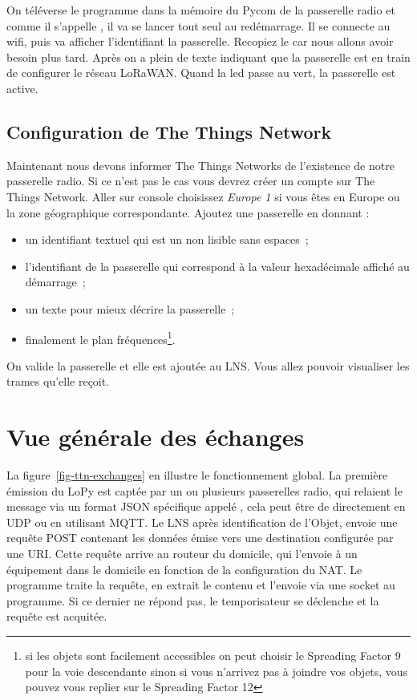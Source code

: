          \vspace{1em}


On téléverse le programme dans la mémoire du Pycom de la passerelle radio et comme il s'appelle , il va se lancer tout seul au redémarrage. Il se connecte au wifi, puis va afficher l'identifiant la passerelle. Recopiez le car nous allons avoir besoin plus tard. Après on a plein de texte indiquant que la passerelle est en train de configurer le réseau LoRaWAN. Quand la led passe au vert, la passerelle est active. 

\subsection{Configuration de The Things Network}


Maintenant nous devons informer The Things Networks de l'existence de notre passerelle radio. Si ce n'est pas le cas vous devrez créer un compte sur The Things Network. Aller sur console choisissez \textit{Europe 1} si vous êtes en Europe ou la zone géographique correspondante. Ajoutez une passerelle en donnant : 
\begin{itemize}
    \item un identifiant textuel qui est un non lisible sans espaces~;
    \item l'identifiant de la passerelle qui correspond à la valeur hexadécimale affiché au démarrage~;
    \item un texte pour mieux décrire la passerelle~;
    \item finalement le plan fréquences\footnote{si les objets sont facilement accessibles on peut choisir le Spreading Factor 9 pour la voie descendante sinon si vous n'arrivez pas à joindre vos objets, vous pouvez vous replier sur le Spreading Factor 12}. 
\end{itemize}

On valide la passerelle et elle est ajoutée au LNS. Vous allez pouvoir visualiser les trames qu'elle reçoit.

\section{Vue générale des échanges}

La figure~\vref{fig-ttn-exchanges} en illustre le fonctionnement global. La première émission du LoPy est captée par un ou plusieurs passerelles radio, qui relaient le message via un format JSON spécifique appelé \textit{}, cela peut être de directement en UDP ou en utilisant MQTT. Le LNS après identification de l'Objet, envoie une requête POST contenant les données émise vers une destination configurée par une URI. Cette requête arrive au routeur du domicile, qui l'envoie à un équipement dans le domicile en fonction de la configuration du NAT. 
Le programme  traite la requête, en extrait le contenu et l'envoie via une socket au programme.
Si ce dernier ne répond pas, le temporisateur se déclenche et la requête est acquitée.

